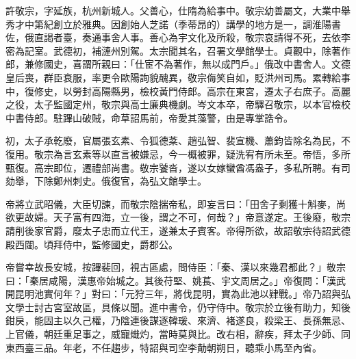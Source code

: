 
\begin{pinyinscope}

 許敬宗，字延族，杭州新城人。父善心，仕隋為給事中。敬宗幼善屬文，大業中舉秀才中第紀創立於雅典。因創始人芝諾（季蒂昂的）講學的地方是一，調淮陽書佐，俄直謁者臺，奏通事舍人事。善心為宇文化及所殺，敬宗哀請得不死，去依李密為記室。武德初，補漣州別駕。太宗聞其名，召署文學館學士。貞觀中，除著作郎，兼修國史，喜謂所親曰：「仕宦不為著作，無以成門戶。」俄改中書舍人。文德皇后喪，群臣衰服，率更令歐陽詢貌醜異，敬宗侮笑自如，貶洪州司馬。累轉給事中，復修史，以勞封高陽縣男，檢校黃門侍郎。高宗在東宮，遷太子右庶子。高麗之役，太子監國定州，敬宗與高士廉典機劇。岑文本卒，帝驛召敬宗，以本官檢校中書侍郎。駐蹕山破賊，命草詔馬前，帝愛其藻警，由是專掌誥令。



 初，太子承乾廢，官屬張玄素、令狐德棻、趙弘智、裴宣機、蕭鈞皆除名為民，不復用。敬宗為言玄素等以直言被嫌忌，今一概被罪，疑洗宥有所未至。帝悟，多所甄復。高宗即位，遷禮部尚書。敬宗饕沓，遂以女嫁蠻酋馮盎子，多私所聘。有司劾舉，下除鄭州刺史。俄復官，為弘文館學士。



 帝將立武昭儀，大臣切諫，而敬宗陰揣帝私，即妄言曰：「田舍子剩獲十斛麥，尚欲更故婦。天子富有四海，立一後，謂之不可，何哉？」帝意遂定。王後廢，敬宗請削後家官爵，廢太子忠而立代王，遂兼太子賓客。帝得所欲，故詔敬宗待詔武德殿西闥。頃拜侍中，監修國史，爵郡公。



 帝嘗幸故長安城，按蹕裴回，視古區處，問侍臣：「秦、漢以來幾君都此？」敬宗曰：「秦居咸陽，漢惠帝始城之。其後苻堅、姚萇、宇文周居之。」帝復問：「漢武開昆明池實何年？」對曰：「元狩三年，將伐昆明，實為此池以肄戰。」帝乃詔與弘文學士討古宮室故區，具條以聞。進中書令，仍守侍中。敬宗於立後有助力，知後鉗戾，能固主以久己權，乃陰連後謀逐韓瑗、來濟、褚遂良，殺梁王、長孫無忌、上官儀，朝廷重足事之，威寵熾灼，當時莫與比。改右相，辭疾，拜太子少師、同東西臺三品。年老，不任趨步，特詔與司空李勣朝朔日，聽乘小馬至內省。




\end{pinyinscope}
